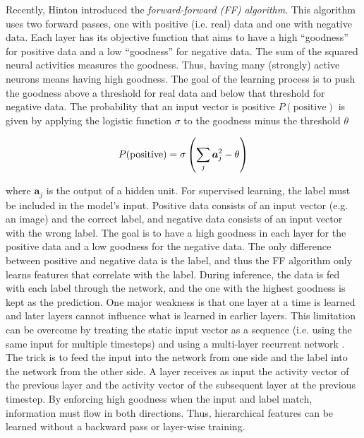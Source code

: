 Recently, Hinton  introduced the \emph{forward-forward (FF) algorithm}.
This algorithm uses two forward passes, one with positive (i.e. real) data and one with negative data.
Each layer has its objective function that aims to have a high ``goodness'' for positive data and a low ``goodness'' for negative data. 
The sum of the squared neural activities measures the goodness. Thus, having many (strongly) active neurons means having high goodness.
The goal of the learning process is to push the goodness above a threshold for real data and below that threshold for negative data.
The probability that an input vector is positive $P(\text{positive}
)$ is given by applying the logistic function $\sigma$ to the goodness minus the threshold $\theta$

\begin{align}\eqlbl{ff2}
	P(\text{positive}) = \sigma \left( \sum_j \boldsymbol{a}^2_j - \theta \right)
\end{align}

where $\boldsymbol{a}_j$ is the output of a hidden unit.
For supervised learning, the label must be included in the model's input.
Positive data consists of an input vector (e.g. an image) and the correct label, and negative data consists of an input vector with the wrong label.
The goal is to have a high goodness in each layer for the positive data and a low goodness for the negative data.
The only difference between positive and negative data is the label, and thus the FF algorithm only learns features that correlate with the label.
During inference, the data is fed with each label through the network, and the one with the highest goodness is kept as the prediction.
One major weakness is that one layer at a time is learned and later layers cannot influence what is learned in earlier layers.
This limitation can be overcome by treating the static input vector as a sequence (i.e. using the same input for multiple timesteps) and using a multi-layer recurrent network .
The trick is to feed the input into the network from one side and the label into the network from the other side. A layer receives as input the activity vector of the previous layer and the activity vector of the subsequent layer at the previous timestep. By enforcing high goodness when the input and label match, information must flow in both directions. Thus, hierarchical features can be learned without a backward pass or layer-wise training.


